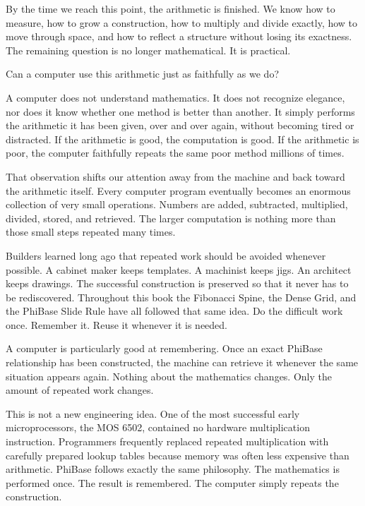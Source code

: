 \label{stone:computer}

By the time we reach this point, the arithmetic is finished. We know how to measure, how to grow a construction, how to multiply and divide exactly, how to move through space, and how to reflect a structure without losing its exactness. The remaining question is no longer mathematical. It is practical.

Can a computer use this arithmetic just as faithfully as we do?

A computer does not understand mathematics. It does not recognize elegance, nor does it know whether one method is better than another. It simply performs the arithmetic it has been given, over and over again, without becoming tired or distracted. If the arithmetic is good, the computation is good. If the arithmetic is poor, the computer faithfully repeats the same poor method millions of times.

That observation shifts our attention away from the machine and back toward the arithmetic itself. Every computer program eventually becomes an enormous collection of very small operations. Numbers are added, subtracted, multiplied, divided, stored, and retrieved. The larger computation is nothing more than those small steps repeated many times.

Builders learned long ago that repeated work should be avoided whenever possible. A cabinet maker keeps templates. A machinist keeps jigs. An architect keeps drawings. The successful construction is preserved so that it never has to be rediscovered. Throughout this book the Fibonacci Spine, the Dense Grid, and the PhiBase Slide Rule have all followed that same idea. Do the difficult work once. Remember it. Reuse it whenever it is needed.

A computer is particularly good at remembering. Once an exact PhiBase relationship has been constructed, the machine can retrieve it whenever the same situation appears again. Nothing about the mathematics changes. Only the amount of repeated work changes.

This is not a new engineering idea. One of the most successful early microprocessors, the MOS 6502, contained no hardware multiplication instruction. Programmers frequently replaced repeated multiplication with carefully prepared lookup tables because memory was often less expensive than arithmetic. PhiBase follows exactly the same philosophy. The mathematics is performed once. The result is remembered. The computer simply repeats the construction.

